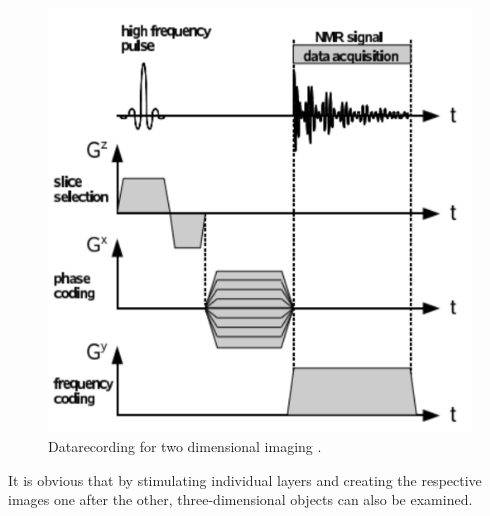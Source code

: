 \begin{figure}[ht]
\centering
\includegraphics[scale=.25]{images//signal.png}
\caption{Datarecording for two dimensional imaging \cite{script_nmr}.}
\label{fig:signal}
\end{figure}
It is obvious that by stimulating individual layers and creating the respective images one after the other, three-dimensional objects can also be examined.